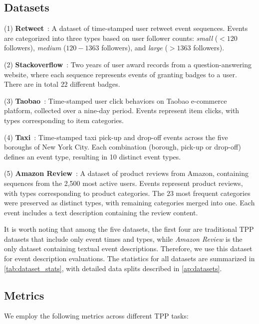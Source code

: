 


\subsection{Datasets}
\label{ssec:datasets}
(1) \textbf{Retweet}~\citep{zhou2013learning}: A dataset of time-stamped user retweet event sequences. Events are categorized into three types based on user follower counts: \textit{small} ($< 120$ followers), \textit{medium} ($120-1363$ followers), and \textit{large} ($> 1363$ followers).

(2) \textbf{Stackoverflow}~\citep{jure2014snap}: Two years of user award records from a question-answering website, where each sequence represents events of granting badges to a user. There are in total $22$ different badges. 

(3) \textbf{Taobao}~\citep{xue2022hypro}: Time-stamped user click behaviors on Taobao e-commerce platform, collected over a nine-day period. Events represent item clicks, with types corresponding to item categories.

(4) \textbf{Taxi}~\citep{whong2014foiling}: Time-stamped taxi pick-up and drop-off events across the five boroughs of New York City. Each combination (borough, pick-up or drop-off) defines an event type, resulting in 10 distinct event types. 

(5) \textbf{Amazon Review}~\citep{ni2019justifying}: A dataset of product reviews from Amazon, containing sequences from the 2,500 most active users. Events represent product reviews, with types corresponding to product categories. The $23$ most frequent categories were preserved as distinct types, with remaining categories merged into one. 
Each event includes a text description containing the review content. 

It is worth noting that among the five datasets, the first four are traditional TPP datasets that include only event times and types, while \textit{Amazon Review} is the only dataset containing textual event descriptions. Therefore, we use this dataset for event description evaluations.
The statistics for all datasets are summarized in \cref{tab:dataset_stats}, with detailed data splits described in \cref{ap:datasets}. 
 

\subsection{Metrics}
We employ the following metrics across different TPP tasks: 

